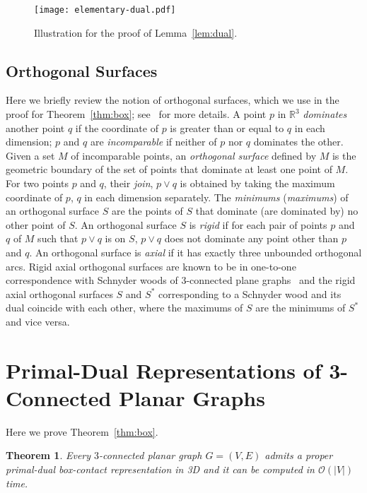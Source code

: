 \documentclass{article}
\newcounter{dummycount}
\newtheorem{theorem}{Theorem}
\newenvironment{backInTime}[1]
{
\setcounter{dummycount}{\value{theorem}}
\setcounter{theorem}{\value{#1}}
}
{
\setcounter{theorem}{\value{dummycount}}
}
\newcommand{\R}{\mathbb R}
\newcommand{\df}{\textit}
\newcommand{\Oh}{{\ensuremath{\mathcal{O}}}}
\begin{document}
\begin{figure}[htbp]
\centering
\texttt{[image: elementary-dual.pdf]}
\caption{Illustration for the proof of Lemma~\ref{lem:dual}.}
\label{fig:elementary-dual}
\end{figure}







\subsection{Orthogonal Surfaces}
\label{sec:ortho}

Here we briefly review the notion of orthogonal surfaces, which we use in the proof for
 Theorem~\ref{thm:box}; see~\cite{FZ08} for more details.
A point $p$ in $\R^3$ \df{dominates} another point $q$ if the coordinate of $p$ is greater than or equal to
 $q$ in each dimension; $p$ and $q$ are \df{incomparable} if neither of $p$ nor $q$ dominates the other.
 Given a set $M$ of incomparable points, an \df{orthogonal surface} defined by $M$ is the geometric
 boundary of the set of points that dominate at least one point of $M$.
For two points $p$ and $q$, their \df{join}, $p\lor q$ is obtained by taking the maximum coordinate of
 $p$, $q$ in each dimension separately. The \df{minimums} (\df{maximums})
 of an orthogonal surface $S$ are the points of $S$ that dominate (are dominated by) no other
 point of $S$. An orthogonal surface $S$ is \df{rigid} if for each pair of points $p$ and $q$ of $M$ such that
 $p\lor q$ is on $S$, $p\lor q$ does not dominate any point other than $p$ and $q$.
 An orthogonal surface is \df{axial} if it has exactly three unbounded orthogonal arcs.
 Rigid axial orthogonal surfaces are known to be in one-to-one correspondence with Schnyder woods
 of 3-connected plane graphs~\cite{FZ08} and the rigid axial orthogonal surfaces $S$ and $S^*$
 corresponding to a Schnyder wood and its dual coincide with each other, where the maximums of
 $S$ are the minimums of $S^*$ and vice versa.


\section{Primal-Dual Representations of 3-Connected Planar Graphs}
\label{sec:pri-du}

Here we prove Theorem~\ref{thm:box}.


\begin{backInTime}{thm-box}
 \begin{theorem}
  Every $3$-connected planar graph $G=(V,E)$ admits a proper primal-dual box-contact representation in 3D and it can be computed in $\Oh(|V|)$ time.
 \end{theorem}
\end{backInTime}
\end{document}
